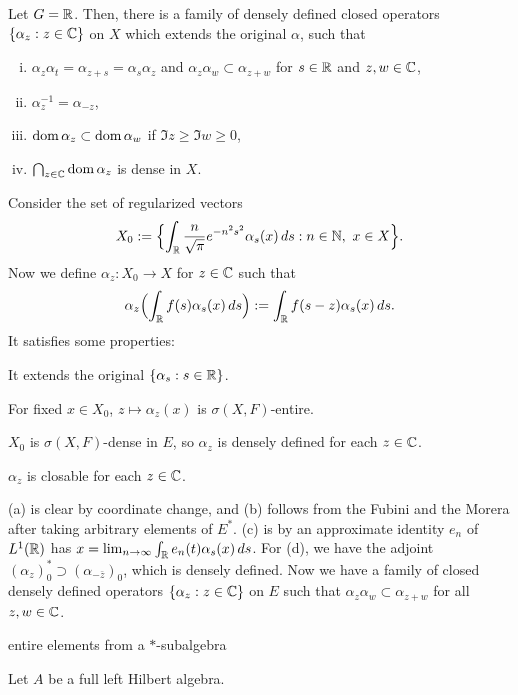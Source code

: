 \documentclass{../../small}
\begin{document}
\begin{thm}
Let $G=\mathbb{R}$.
Then, there is a family of densely defined closed operators $\{\alpha_z:z\in\mathbb{C}\}$ on $X$ which extends the original $\alpha$, such that
\begin{enumerate}[(i)]
\item $\alpha_z\alpha_t=\alpha_{z+s}=\alpha_s\alpha_z$ and $\alpha_z\alpha_w\subset\alpha_{z+w}$ for $s\in\mathbb{R}$ and $z,w\in\mathbb{C}$,
\item $\alpha_z^{-1}=\alpha_{-z}$,
\item $\operatorname{dom}\alpha_z\subset\operatorname{dom}\alpha_w$ if $\Im z\ge\Im w\ge0$,
\item $\bigcap_{z\in\mathbb{C}}\operatorname{dom}\alpha_z$ is dense in $X$.
\end{enumerate}
\end{thm}
\begin{pf}
Consider the set of regularized vectors
\[X_0:=\Bigl\{\int_{\mathbb{R}} \frac n{\sqrt\pi}e^{-n^2s^2}\alpha_s(x)\,ds:n\in\mathbb{N},\ x\in X\Bigr\}.\]
Now we define $\alpha_z:X_0\to X$ for $z\in\mathbb{C}$ such that
\[\alpha_z\Bigl(\int_{\mathbb{R}} f(s)\alpha_s(x)\,ds\Bigr):=\int_{\mathbb{R}} f(s-z)\alpha_s(x)\,ds.\]
It satisfies some properties:
\begin{parts}
\item It extends the original $\{\alpha_s:s\in\mathbb{R}\}$.
\item For fixed $x\in X_0$, $z\mapsto\alpha_z(x)$ is $\sigma(X,F)$-entire.
\item $X_0$ is $\sigma(X,F)$-dense in $E$, so $\alpha_z$ is densely defined for each $z\in\mathbb{C}$.
\item $\alpha_z$ is closable for each $z\in\mathbb{C}$.
\end{parts}
(a) is clear by coordinate change, and (b) follows from the Fubini and the Morera after taking arbitrary elements of $E^*$.
(c) is by an approximate identity $e_n$ of $L^1(\mathbb{R})$ has $x=\lim_{n\to\infty}\int_{\mathbb{R}} e_n(t)\alpha_s(x)\,ds$.
For (d), we have the adjoint $(\alpha_z)_0^*\supset(\alpha_{-\bar z})_0$, which is densely defined.
Now we have a family of closed densely defined operators $\{\alpha_z:z\in\mathbb{C}\}$ on $E$ such that $\alpha_z\alpha_w\subset\alpha_{z+w}$ for all $z,w\in\mathbb{C}$.
\end{pf}


\begin{defn}
entire elements from a $*$-subalgebra
\end{defn}
\begin{defn}
Let $A$ be a full left Hilbert algebra.

\end{defn}
\end{document}
